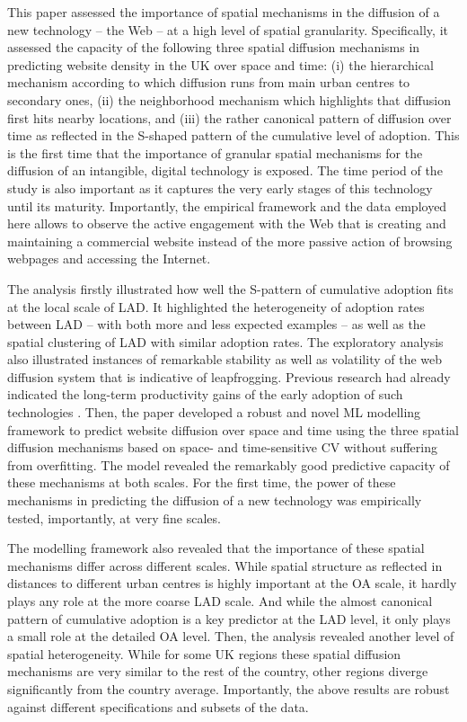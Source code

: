 \documentclass[
  authoryear,
  preprint,
  3p]{elsarticle}
\begin{document}
This paper assessed the importance of spatial mechanisms in the
diffusion of a new technology -- the Web -- at a high level of spatial
granularity. Specifically, it assessed the capacity of the following
three spatial diffusion mechanisms in predicting website density in the
UK over space and time: (i) the hierarchical mechanism according to
which diffusion runs from main urban centres to secondary ones, (ii) the
neighborhood mechanism which highlights that diffusion first hits nearby
locations, and (iii) the rather canonical pattern of diffusion over time
as reflected in the S-shaped pattern of the cumulative level of
adoption. This is the first time that the importance of granular spatial
mechanisms for the diffusion of an intangible, digital technology is
exposed. The time period of the study is also important as it captures
the very early stages of this technology until its maturity.
Importantly, the empirical framework and the data employed here allows
to observe the active engagement with the Web that is creating and
maintaining a commercial website instead of the more passive action of
browsing webpages and accessing the Internet.

The analysis firstly illustrated how well the S-pattern of cumulative
adoption fits at the local scale of LAD. It highlighted the
heterogeneity of adoption rates between LAD -- with both more and less
expected examples -- as well as the spatial clustering of LAD with
similar adoption rates. The exploratory analysis also illustrated
instances of remarkable stability as well as volatility of the web
diffusion system that is indicative of leapfrogging. Previous research
had already indicated the long-term productivity gains of the early
adoption of such technologies \citep{tranosuk}. Then, the paper
developed a robust and novel ML modelling framework to predict website
diffusion over space and time using the three spatial diffusion
mechanisms based on space- and time-sensitive CV without suffering from
overfitting. The model revealed the remarkably good predictive capacity
of these mechanisms at both scales. For the first time, the power of
these mechanisms in predicting the diffusion of a new technology was
empirically tested, importantly, at very fine scales.

The modelling framework also revealed that the importance of these
spatial mechanisms differ across different scales. While spatial
structure as reflected in distances to different urban centres is highly
important at the OA scale, it hardly plays any role at the more coarse
LAD scale. And while the almost canonical pattern of cumulative adoption
is a key predictor at the LAD level, it only plays a small role at the
detailed OA level. Then, the analysis revealed another level of spatial
heterogeneity. While for some UK regions these spatial diffusion
mechanisms are very similar to the rest of the country, other regions
diverge significantly from the country average. Importantly, the above
results are robust against different specifications and subsets of the
data.
\end{document}
